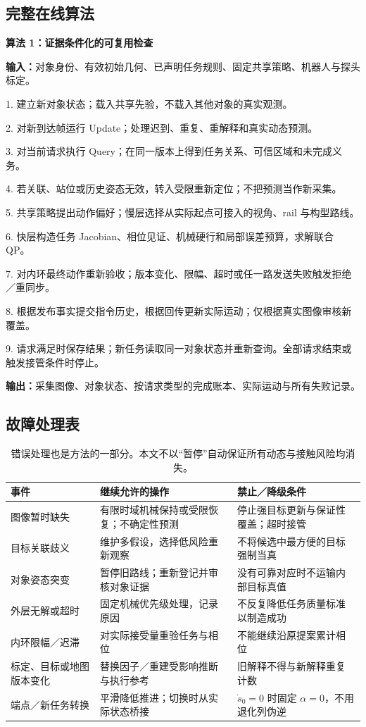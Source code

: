 \documentclass[UTF8,11pt,a4paper,fontset=fandol]{ctexart}
\numberwithin{equation}{section}
\theoremstyle{definition}
\begin{document}
\subsection{完整在线算法}
\begin{keybox}\small
\textbf{算法 1：证据条件化的可复用检查}\par
\textbf{输入：}对象身份、有效初始几何、已声明任务规则、固定共享策略、机器人与探头标定。\par
1. 建立新对象状态；载入共享先验，不载入其他对象的真实观测。\par
2. 对新到达帧运行 Update；处理迟到、重复、重解释和真实动态预测。\par
3. 对当前请求执行 Query；在同一版本上得到任务关系、可信区域和未完成义务。\par
4. 若关联、站位或历史姿态无效，转入受限重新定位；不把预测当作新采集。\par
5. 共享策略提出动作偏好；慢层选择从实际起点可接入的视角、rail 与构型路线。\par
6. 快层构造任务 Jacobian、相位见证、机械硬行和局部误差预算，求解联合 QP。\par
7. 对内环最终动作重新验收；版本变化、限幅、超时或任一路发送失败触发拒绝／重同步。\par
8. 根据发布事实提交指令历史，根据回传更新实际运动；仅根据真实图像审核新覆盖。\par
9. 请求满足时保存结果；新任务读取同一对象状态并重新查询。全部请求结束或触发接管条件时停止。\par
\textbf{输出：}采集图像、对象状态、按请求类型的完成账本、实际运动与所有失败记录。
\end{keybox}

\subsection{故障处理表}
\begin{table}[htbp]\centering\small
\begin{tabularx}{\linewidth}{P{31mm}YY}
\toprule
事件 & 继续允许的操作 & 禁止／降级条件\\\midrule
图像暂时缺失 & 有限时域机械保持或受限恢复；不确定性预测 & 停止强目标更新与保证性覆盖；超时接管\\
目标关联歧义 & 维护多假设，选择低风险重新观察 & 不将候选中最方便的目标强制当真\\
对象姿态突变 & 暂停旧路线；重新登记并审核对象证据 & 没有可靠对应时不运输内部目标真值\\
外层无解或超时 & 固定机械优先级处理，记录原因 & 不反复降低任务质量标准以制造成功\\
内环限幅／迟滞 & 对实际接受量重验任务与相位 & 不能继续沿原提案累计相位\\
标定、目标或地图版本变化 & 替换因子／重建受影响推断与执行参考 & 旧解释不得与新解释重复计数\\
端点／新任务转换 & 平滑降低推进；切换时从实际状态桥接 & $\dot s_0=0$ 时固定 $\alpha=0$，不用退化列伪逆\\\bottomrule
\end{tabularx}
\caption{错误处理也是方法的一部分。本文不以“暂停”自动保证所有动态与接触风险均消失。}
\end{table}
\end{document}
